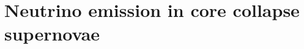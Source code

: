 \documentclass[a4paper,11pt]{article}
\begin{document}






\section{Neutrino emission in core collapse supernovae}
\label{s21}

\end{document}
